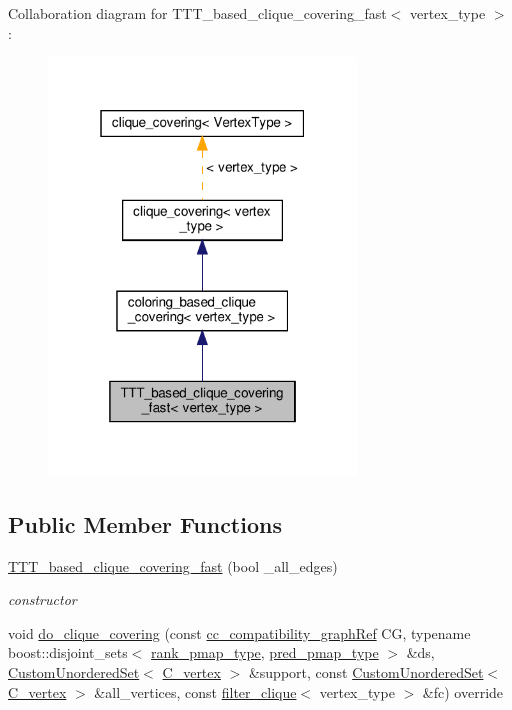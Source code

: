 Collaboration diagram for T\+T\+T\+\_\+based\+\_\+clique\+\_\+covering\+\_\+fast$<$ vertex\+\_\+type $>$\+:
\nopagebreak
\begin{figure}[H]
\begin{center}
\leavevmode
\includegraphics[width=232pt]{de/dfb/classTTT__based__clique__covering__fast__coll__graph}
\end{center}
\end{figure}
\subsection*{Public Member Functions}
\begin{DoxyCompactItemize}
\item 
\hyperlink{classTTT__based__clique__covering__fast_a73d9b9cb50e6556cd8b6719b23314c35}{T\+T\+T\+\_\+based\+\_\+clique\+\_\+covering\+\_\+fast} (bool \+\_\+all\+\_\+edges)
\begin{DoxyCompactList}\small\item\em constructor \end{DoxyCompactList}\item 
void \hyperlink{classTTT__based__clique__covering__fast_a64be6008ee231bbaf326cef4b502e643}{do\+\_\+clique\+\_\+covering} (const \hyperlink{clique__covering__graph_8hpp_ac7a90ca8b64cfc536aaf17bc81186c18}{cc\+\_\+compatibility\+\_\+graph\+Ref} CG, typename boost\+::disjoint\+\_\+sets$<$ \hyperlink{clique__covering__graph_8hpp_af170aff46b9e4328f1ad9b119cf78b4a}{rank\+\_\+pmap\+\_\+type}, \hyperlink{clique__covering__graph_8hpp_af4c454ac367cfb12e29c98e6bc942a06}{pred\+\_\+pmap\+\_\+type} $>$ \&ds, \hyperlink{classCustomUnorderedSet}{Custom\+Unordered\+Set}$<$ \hyperlink{clique__covering__graph_8hpp_a9cb45047ea8c5ed95a8cfa90494345aa}{C\+\_\+vertex} $>$ \&support, const \hyperlink{classCustomUnorderedSet}{Custom\+Unordered\+Set}$<$ \hyperlink{clique__covering__graph_8hpp_a9cb45047ea8c5ed95a8cfa90494345aa}{C\+\_\+vertex} $>$ \&all\+\_\+vertices, const \hyperlink{structfilter__clique}{filter\+\_\+clique}$<$ vertex\+\_\+type $>$ \&fc) override
\end{DoxyCompactItemize}
